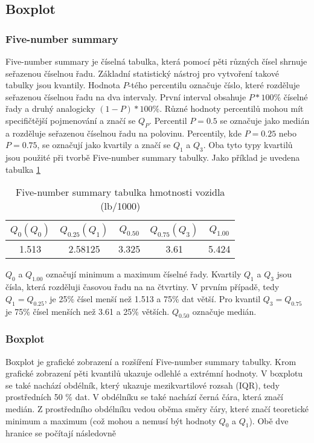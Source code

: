 \subsection{Boxplot}
\subsubsection{Five-number summary}
Five-number summary je číselná tabulka, která pomocí pěti různých čísel shrnuje seřazenou číselnou řadu. Základní statistický nástroj pro
vytvoření takové tabulky jsou kvantily. Hodnota $P$-tého percentilu označuje číslo, které rozděluje seřazenou číselnou řadu na dva intervaly. 
První interval obsahuje $P*100\%$ číselné řady a druhý analogicky $(1-P)*100\%$. Různé hodnoty percentilů mohou mít specifičtější pojmenování a značí se $Q_P$.
Percentil $P = 0.5$ se označuje jako medián a rozděluje seřazenou číselnou řadu na polovinu. Percentily, kde $P = 0.25$ nebo $P = 0.75$, se označují
jako kvartily a značí se $Q_{1}$ a $Q_{3}$. Oba tyto typy kvartilů jsou použité při tvorbě Five-number summary tabulky. Jako příklad je
uvedena tabulka \ref{tab:five-number_summary}

\begin{table}[H]

    \centering
    \begin{tabular}[t]{c|c|c|c|c}
        \hline
        $Q_{0} (Q_0)$ & $Q_{0.25} (Q_1) $ & $Q_{0.50}$ & $Q_{0.75} (Q_3)$ & $Q_{1.00}$\\
        \hline
        1.513 & 2.58125 & 3.325 & 3.61 & 5.424\\
        \hline
    \end{tabular}
    \caption{\label{tab:five-number_summary}Five-number summary tabulka hmotnosti vozidla (lb/1000)}
\end{table}

$Q_{0}$ a $Q_{1.00}$ označují minimum a maximum číselné řady. Kvartily $Q_{1}$ a $Q_{3}$ jsou čísla, která rozděluji časovou řadu na na čtvrtiny. V prvním
případě, tedy $Q_1 = Q_{0.25}$, je 25\% čísel menší než 1.513 a 75\% dat větší. Pro kvantil $Q_3 = Q_{0.75}$ je 75\% čísel menších než 3.61 a 25\% větších. $Q_{0.50}$ označuje medián.

\subsubsection{Boxplot}
Boxplot je grafické zobrazení a rozšíření Five-number summary tabulky. Krom grafické zobrazení 
{\color{red}
pěti kvantilů  ukazuje odlehlé a extrémní hodnoty.
}
V boxplotu se také nachází obdélník, který ukazuje mezikvartilové rozsah (IQR), tedy prostředních 50 \% dat. V obdélníku se také nachází černá čára, která značí medián.
Z prostředního obdélníku vedou oběma směry čáry, které značí teoretické minimum a maximum
{\color{red}
(což mohou a nemusí být hodnoty $Q_0$ a $Q_1$).
}
Obě dve hranice se počítají následovně

